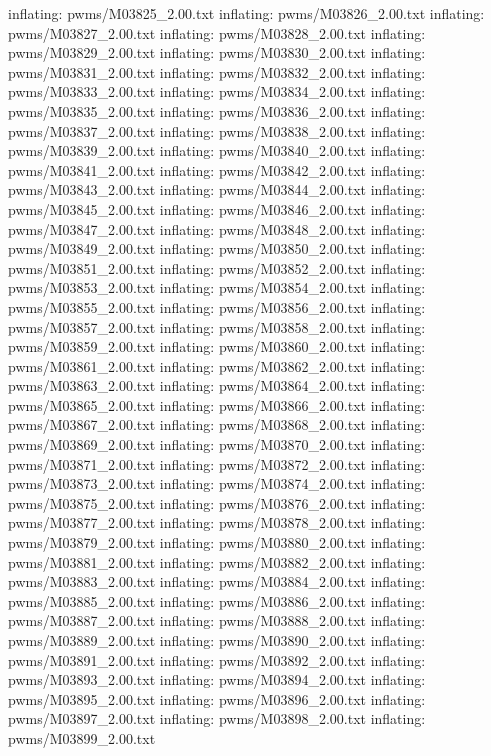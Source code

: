 \documentclass[letterpaper,10pt,english]{sphinxmanual}
\begin{document}
{\begin{sphinxVerbatim}[commandchars=\\\{\}]
  inflating: pwms/M03825\_2.00.txt
  inflating: pwms/M03826\_2.00.txt
  inflating: pwms/M03827\_2.00.txt
  inflating: pwms/M03828\_2.00.txt
  inflating: pwms/M03829\_2.00.txt
  inflating: pwms/M03830\_2.00.txt
  inflating: pwms/M03831\_2.00.txt
  inflating: pwms/M03832\_2.00.txt
  inflating: pwms/M03833\_2.00.txt
  inflating: pwms/M03834\_2.00.txt
  inflating: pwms/M03835\_2.00.txt
  inflating: pwms/M03836\_2.00.txt
  inflating: pwms/M03837\_2.00.txt
  inflating: pwms/M03838\_2.00.txt
  inflating: pwms/M03839\_2.00.txt
  inflating: pwms/M03840\_2.00.txt
  inflating: pwms/M03841\_2.00.txt
  inflating: pwms/M03842\_2.00.txt
  inflating: pwms/M03843\_2.00.txt
  inflating: pwms/M03844\_2.00.txt
  inflating: pwms/M03845\_2.00.txt
  inflating: pwms/M03846\_2.00.txt
  inflating: pwms/M03847\_2.00.txt
  inflating: pwms/M03848\_2.00.txt
  inflating: pwms/M03849\_2.00.txt
  inflating: pwms/M03850\_2.00.txt
  inflating: pwms/M03851\_2.00.txt
  inflating: pwms/M03852\_2.00.txt
  inflating: pwms/M03853\_2.00.txt
  inflating: pwms/M03854\_2.00.txt
  inflating: pwms/M03855\_2.00.txt
  inflating: pwms/M03856\_2.00.txt
  inflating: pwms/M03857\_2.00.txt
  inflating: pwms/M03858\_2.00.txt
  inflating: pwms/M03859\_2.00.txt
  inflating: pwms/M03860\_2.00.txt
  inflating: pwms/M03861\_2.00.txt
  inflating: pwms/M03862\_2.00.txt
  inflating: pwms/M03863\_2.00.txt
  inflating: pwms/M03864\_2.00.txt
  inflating: pwms/M03865\_2.00.txt
  inflating: pwms/M03866\_2.00.txt
  inflating: pwms/M03867\_2.00.txt
  inflating: pwms/M03868\_2.00.txt
  inflating: pwms/M03869\_2.00.txt
  inflating: pwms/M03870\_2.00.txt
  inflating: pwms/M03871\_2.00.txt
  inflating: pwms/M03872\_2.00.txt
  inflating: pwms/M03873\_2.00.txt
  inflating: pwms/M03874\_2.00.txt
  inflating: pwms/M03875\_2.00.txt
  inflating: pwms/M03876\_2.00.txt
  inflating: pwms/M03877\_2.00.txt
  inflating: pwms/M03878\_2.00.txt
  inflating: pwms/M03879\_2.00.txt
  inflating: pwms/M03880\_2.00.txt
  inflating: pwms/M03881\_2.00.txt
  inflating: pwms/M03882\_2.00.txt
  inflating: pwms/M03883\_2.00.txt
  inflating: pwms/M03884\_2.00.txt
  inflating: pwms/M03885\_2.00.txt
  inflating: pwms/M03886\_2.00.txt
  inflating: pwms/M03887\_2.00.txt
  inflating: pwms/M03888\_2.00.txt
  inflating: pwms/M03889\_2.00.txt
  inflating: pwms/M03890\_2.00.txt
  inflating: pwms/M03891\_2.00.txt
  inflating: pwms/M03892\_2.00.txt
  inflating: pwms/M03893\_2.00.txt
  inflating: pwms/M03894\_2.00.txt
  inflating: pwms/M03895\_2.00.txt
  inflating: pwms/M03896\_2.00.txt
  inflating: pwms/M03897\_2.00.txt
  inflating: pwms/M03898\_2.00.txt
  inflating: pwms/M03899\_2.00.txt

\end{sphinxVerbatim}}
\end{document}
